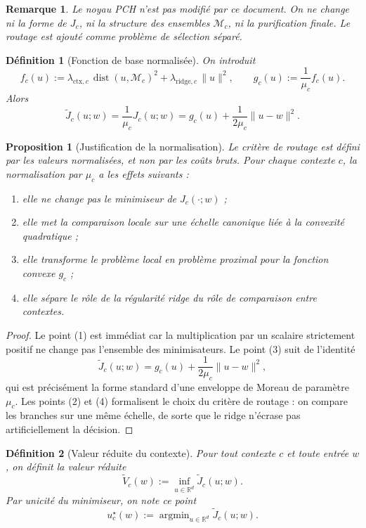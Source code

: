 \documentclass[11pt,a4paper]{article}
\newtheorem{definition}{Définition}[section]
\newtheorem{proposition}{Proposition}[section]
\newtheorem{remark}{Remarque}[section]
\DeclareMathOperator{\argmin}{argmin}
\DeclareMathOperator{\dist}{dist}
\newcommand{\R}{\mathbb R}
\newcommand{\Mcal}{\mathcal M}
\begin{document}
\begin{remark}
Le noyau PCH n'est pas modifié par ce document. On ne change ni la forme de \(J_c\), ni la structure des ensembles \(\Mcal_c\), ni la purification finale. Le routage est ajouté comme problème de sélection séparé.
\end{remark}

\begin{definition}[Fonction de base normalisée]
On introduit
\[
f_c(u):=\lambda_{\mathrm{ctx},c}\,\dist(u,\Mcal_c)^2+\lambda_{\mathrm{ridge},c}\,\|u\|^2,
\qquad
g_c(u):=\frac{1}{\mu_c}f_c(u).
\]
Alors
\[
\widetilde J_c(u;w)=\frac{1}{\mu_c}J_c(u;w)
=
g_c(u)+\frac{1}{2\mu_c}\|u-w\|^2.
\]
\end{definition}

\begin{proposition}[Justification de la normalisation]
Le critère de routage est défini par les valeurs normalisées, et non par les coûts bruts. Pour chaque contexte \(c\), la normalisation par \(\mu_c\) a les effets suivants :
\begin{enumerate}[leftmargin=2em]
\item elle ne change pas le minimiseur de \(J_c(\cdot;w)\) ;
\item elle met la comparaison locale sur une échelle canonique liée à la convexité quadratique ;
\item elle transforme le problème local en problème proximal pour la fonction convexe \(g_c\) ;
\item elle sépare le rôle de la régularité ridge du rôle de comparaison entre contextes.
\end{enumerate}
\end{proposition}

\begin{proof}
Le point (1) est immédiat car la multiplication par un scalaire strictement positif ne change pas l'ensemble des minimisateurs. Le point (3) suit de l'identité
\[
\widetilde J_c(u;w)=g_c(u)+\frac{1}{2\mu_c}\|u-w\|^2,
\]
qui est précisément la forme standard d'une enveloppe de Moreau de paramètre \(\mu_c\). Les points (2) et (4) formalisent le choix du critère de routage : on compare les branches sur une même échelle, de sorte que le ridge n'écrase pas artificiellement la décision.
\end{proof}

\begin{definition}[Valeur réduite du contexte]
Pour tout contexte \(c\) et toute entrée \(w\), on définit la valeur réduite
\[
\widetilde V_c(w):=\inf_{u\in\R^d}\widetilde J_c(u;w).
\]
Par unicité du minimiseur, on note ce point
\[
u_c^\star(w):=\argmin_{u\in\R^d}\widetilde J_c(u;w).
\]
\end{definition}
\end{document}
